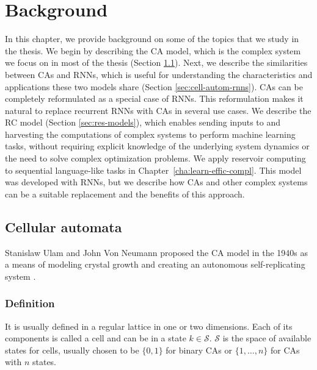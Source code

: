 \chapter{Background}
\label{cha:background}

In this chapter, we provide background on some of the topics that we study in the
thesis. We begin by describing the \acf{CA} model, which is the complex system
we focus on in most of the thesis (Section \ref{sec:cellular-automata-sec}).
Next, we describe the similarities between \acp{CA} and \acfp{RNN}, which is
useful for understanding the characteristics and applications these two models
share (Section \ref{sec:cell-autom-rnns}). \acp{CA} can be completely reformulated 
as a special case of \acp{RNN}. This reformulation makes it natural to replace 
recurrent \acp{RNN} with \acp{CA} in several use cases. We
describe the \acf{RC} model (Section \ref{sec:res-models}), which enables
sending inputs to and harvesting the computations of complex systems to perform machine learning tasks, without requiring explicit knowledge of the underlying system dynamics or the need to solve complex optimization problems.
 We apply reservoir computing to sequential language-like tasks in Chapter~\ref{cha:learn-effic-compl}. This model was
developed with \acp{RNN}, but we describe how \acp{CA} and other complex systems
can be a suitable replacement and the benefits of this approach.

\section{Cellular automata}\label{sec:cellular-automata-sec}

Stanislaw Ulam and John Von
Neumann proposed the \ac{CA} model in the 1940s as a means 
of modeling crystal growth and creating an autonomous self-replicating system
\parencite{vonneumannTheorySelfreproducingAutomata1966}.

\subsection{Definition}\label{sec:definition}
It is usually defined in a regular lattice in one or two dimensions. Each of its
components is called a cell and can be in a state $k \in \mathcal{S}$. $\mathcal{S}$ is the space of
available states for cells, usually chosen to be $\{0, 1\}$ for binary
\acp{CA} or $\{1, \ldots, n\}$ for \acp{CA} with $n$ states.

